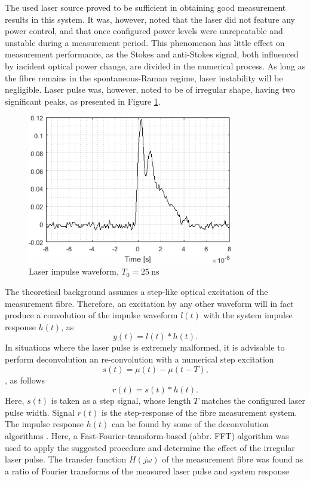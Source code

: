 \documentclass{standalone}
\begin{document}
The used laser source proved to be sufficient in obtaining good measurement results in this system. It was, however, noted that the laser did not feature any power control, and that once configured power levels were unrepeatable and unstable during a measurement period. This phenomenon has little effect on measurement performance, as the Stokes and anti-Stokes signal, both influenced by incident optical power change, are divided in the numerical process. As long as the fibre remains in the spontaneous-Raman regime, laser instability will be negligible. Laser pulse was, however, noted to be of irregular shape, having two significant peaks, as presented in Figure \ref{fig:laser_waveform}.
\begin{figure}[h]
	\centering
	\includegraphics[width=0.8\textwidth]{laser_waveform.png}
	\caption{Laser impulse waveform, $T_0 = \SI{25}{\nano \second}$}
	\label{fig:laser_waveform}
\end{figure}
The theoretical background assumes a step-like optical excitation of the measurement fibre. Therefore, an excitation by any other waveform will in fact produce a convolution of the impulse waveform $l(t)$ with the system impulse response $h(t)$, as
\begin{equation}
y(t) = l(t) \ast h(t) \textrm{.}
\end{equation}
In situations where the laser pulse is extremely malformed, it is advisable to perform deconvolution an re-convolution with a numerical step excitation
\begin{equation}
s(t) = \mu(t) - \mu(t-T) \textrm{,}
\end{equation}, as follows
\begin{equation}
r(t) = s(t) \ast h(t) \textrm{.}
\end{equation}
Here, $s(t)$ is taken as a step signal, whose length $T$ matches the configured laser pulse width. Signal $r(t)$ is the step-response of the fibre measurement system. The impulse response $h(t)$ can be found by some of the deconvolution algorithms \cite{fer:obrinf}. Here, a Fast-Fourier-transform-based (abbr. FFT) algorithm was used to apply the suggested procedure and determine the effect of the irregular laser pulse. The transfer function $H(j\omega)$ of the measurement fibre was found as a ratio of Fourier transforms of the measured laser pulse and system response
\end{document}
